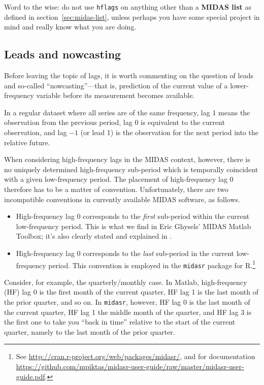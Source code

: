 \documentclass{article}
\begin{document}
Word to the wise: do not use \texttt{hflags} on anything other than a
\textbf{MIDAS list} as defined in section~\ref{sec:midas-list}, unless
perhaps you have some special project in mind and really know what you
are doing.

\subsection{Leads and nowcasting}

Before leaving the topic of lags, it is worth commenting on the
question of leads and so-called ``nowcasting''---that is, prediction
of the current value of a lower-frequency variable before its
measurement becomes available.

In a regular dataset where all series are of the same frequency,
lag 1 means the observation from the previous period, lag 0 is
equivalent to the current observation, and lag $-1$ (or lead 1) is the
observation for the next period into the relative future.

When considering high-frequency lags in the MIDAS context, however,
there is no uniquely determined high-frequency sub-period which is
temporally coincident with a given low-frequency period. The placement
of high-frequency lag 0 therefore has to be a matter of
convention. Unfortunately, there are two incompatible conventions in
currently available MIDAS software, as follows.
%
\begin{itemize}
\item High-frequency lag 0 corresponds to the \textit{first}
  sub-period within the current low-frequency period. This is what we
  find in Eric Ghysels' \textsf{MIDAS Matlab Toolbox}; it's also
  clearly stated and explained in \cite{armesto10}.
\item High-frequency lag 0 corresponds to the \textit{last} sub-period
  in the current low-frequency period. This convention is employed in
  the \texttt{midasr} package for \textsf{R}.\footnote{See
    \url{http://cran.r-project.org/web/packages/midasr/}, and for
    documentation
    \url{https://github.com/mpiktas/midasr-user-guide/raw/master/midasr-user-guide.pdf}.}
\end{itemize}
%
Consider, for example, the quarterly/monthly case. In \textsf{Matlab},
high-frequency (HF) lag 0 is the first month of the current quarter,
HF lag 1 is the last month of the prior quarter, and so on. In
\texttt{midasr}, however, HF lag 0 is the last month of the current
quarter, HF lag 1 the middle month of the quarter, and HF lag 3
is the first one to take you ``back in time'' relative to the start
of the current quarter, namely to the last month of the prior
quarter.
\end{document}
